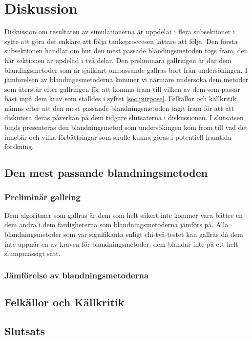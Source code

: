 \documentclass[swedish,a4paper]{article}
\begin{document}


\section{Diskussion}
Diskussion om resultaten av simulationerna är uppdelat i flera subsektioner i
syfte att göra det enklare att följa tankeproccesen lättare att följa. Den
första subsektionen handlar om hur den mest passade blandingsmetoden togs fram,
den här sektionen är updelad i två delar. Den preliminära gallringen är där dem
blandingsmetoder som är själklart ompassande gallras bort från undersökingen. I
jämförelsen av blandingesmetoderna kommer vi närmare undersöka dem metoder som
återstår efter gallringen för att komma fram till vilken av dem som passar bäst
inpå dem krav som ställdes i syftet \ref{sec:purpose}. Felkällor och källkritik
nämns efter att den mest passande blandningsmetoden tagit fram för att att
diskutera deras påverkan på dem tidgare slutsaterna i diskussionen. I slutsatsen
binds presenteras den blandningsmetod som undersökingen kom from till vad det
innebär och vilka förbättringar som skulle kunna göras i potentiell framtida
forskning.

\subsection{Den mest passande blandningsmetoden}

\subsubsection{Preliminär gallring}
Dem algoritmer som gallras är dem som helt säkert inte kommer vara bättre en dem
andra i dem färdigheterna som blandningsmetoderna jämförs på. Alla
blandningsmetoder som var signifikanta enligt chi-två-testet kan gallras då dem
inte uppnår en av kraven för blandningsmetoder, dem blandar inte på ett helt
slumpmässigt sätt.

\subsubsection{Jämförelse av blandningsmetoderna}


\subsection{Felkällor och Källkritik}


\subsection{Slutsats}
\end{document}
